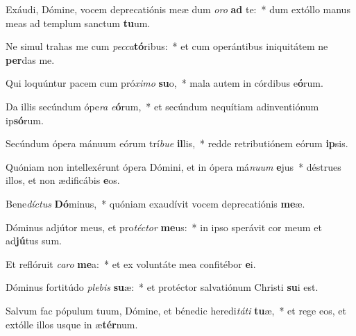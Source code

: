 \item Exáudi, Dómine, vocem deprecatiónis meæ dum \textit{o}\textit{ro} \textbf{ad} te:~* dum extóllo manus meas ad templum sanctum \textbf{tu}um.
\item Ne simul trahas me cum \textit{pec}\textit{ca}\textbf{tó}ribus:~* et cum operántibus iniquitátem ne \textbf{per}das me.
\item Qui loquúntur pacem cum pró\textit{xi}\textit{mo} \textbf{su}o,~* mala autem in córdibus e\textbf{ó}rum.
\item Da illis secúndum ópe\textit{ra} \textit{e}\textbf{ó}rum,~* et secúndum nequítiam adinventiónum ip\textbf{só}rum.
\item Secúndum ópera mánuum eórum trí\textit{bu}\textit{e} \textbf{il}lis,~* redde retributiónem eórum \textbf{ip}sis.
\item Quóniam non intellexérunt ópera Dómini, et in ópera má\textit{nu}\textit{um} \textbf{e}jus~* déstrues illos, et non ædificábis \textbf{e}os.
\item Bene\textit{díc}\textit{tus} \textbf{Dó}minus,~* quóniam exaudívit vocem deprecatiónis \textbf{me}æ.
\item Dóminus adjútor meus, et pro\textit{téc}\textit{tor} \textbf{me}us:~* in ipso sperávit cor meum et ad\textbf{jú}tus sum.
\item Et reflóruit \textit{ca}\textit{ro} \textbf{me}a:~* et ex voluntáte mea confitébor \textbf{e}i.
\item Dóminus fortitúdo \textit{ple}\textit{bis} \textbf{su}æ:~* et protéctor salvatiónum Christi \textbf{su}i est.
\item Salvum fac pópulum tuum, Dómine, et bénedic heredi\textit{tá}\textit{ti} \textbf{tu}æ,~* et rege eos, et extólle illos usque in æ\textbf{tér}num.
